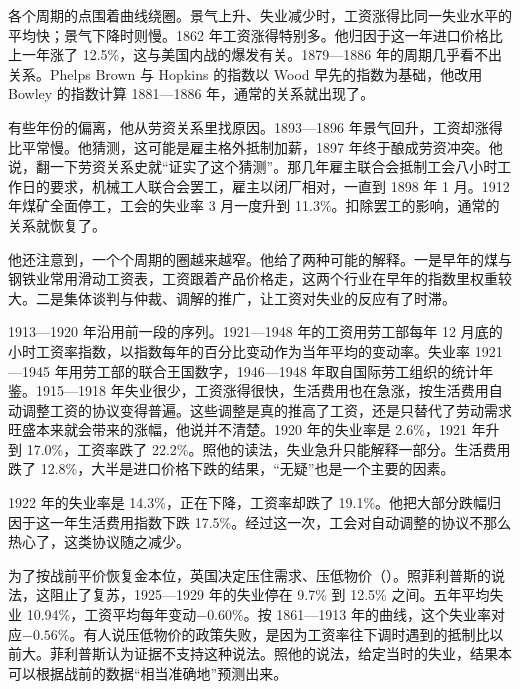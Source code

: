 各个周期的点围着曲线绕圈\cite{phillips1958}。景气上升、失业减少时，工资涨得比同一失业水平的平均快；景气下降时则慢\cite{phillips1958}。1862 年工资涨得特别多。他归因于这一年进口价格比上一年涨了 12.5\%，这与美国内战的爆发有关\cite{phillips1958}。1879—1886 年的周期几乎看不出关系\cite{phillips1958}。Phelps Brown 与 Hopkins 的指数以 Wood 早先的指数为基础，他改用 Bowley 的指数计算 1881—1886 年，通常的关系就出现了\cite{phillips1958}。

有些年份的偏离，他从劳资关系里找原因\cite{phillips1958}。1893—1896 年景气回升，工资却涨得比平常慢。他猜测，这可能是雇主格外抵制加薪，1897 年终于酿成劳资冲突\cite{phillips1958}。他说，翻一下劳资关系史就“证实了这个猜测”。那几年雇主联合会抵制工会八小时工作日的要求，机械工人联合会罢工，雇主以闭厂相对，一直到 1898 年 1 月\cite{phillips1958}。1912 年煤矿全面停工，工会的失业率 3 月一度升到 11.3\%。扣除罢工的影响，通常的关系就恢复了\cite{phillips1958}。

他还注意到，一个个周期的圈越来越窄\cite{phillips1958}。他给了两种可能的解释。一是早年的煤与钢铁业常用滑动工资表，工资跟着产品价格走，这两个行业在早年的指数里权重较大\cite{phillips1958}。二是集体谈判与仲裁、调解的推广，让工资对失业的反应有了时滞\cite{phillips1958}。

1913—1920 年沿用前一段的序列\cite{phillips1958}。1921—1948 年的工资用劳工部每年 12 月底的小时工资率指数，以指数每年的百分比变动作为当年平均的变动率\cite{phillips1958}。失业率 1921—1945 年用劳工部的联合王国数字，1946—1948 年取自国际劳工组织的统计年鉴\cite{phillips1958}。1915—1918 年失业很少，工资涨得很快，生活费用也在急涨，按生活费用自动调整工资的协议变得普遍\cite{phillips1958}。这些调整是真的推高了工资，还是只替代了劳动需求旺盛本来就会带来的涨幅，他说并不清楚\cite{phillips1958}。1920 年的失业率是 2.6\%，1921 年升到 17.0\%，工资率跌了 22.2\%\cite{phillips1958}。照他的读法，失业急升只能解释一部分。生活费用跌了 12.8\%，大半是进口价格下跌的结果，“无疑”也是一个主要的因素\cite{phillips1958}。

1922 年的失业率是 14.3\%，正在下降，工资率却跌了 19.1\%\cite{phillips1958}。他把大部分跌幅归因于这一年生活费用指数下跌 17.5\%\cite{phillips1958}。经过这一次，工会对自动调整的协议不那么热心了，这类协议随之减少\cite{phillips1958}。

为了按战前平价恢复金本位，英国决定压住需求、压低物价（）。照菲利普斯的说法，这阻止了复苏，1925—1929 年的失业停在 9.7\% 到 12.5\% 之间\cite{phillips1958}。五年平均失业 10.94\%，工资平均每年变动$-0.60\%$\cite{phillips1958}。按 1861—1913 年的曲线，这个失业率对应$-0.56\%$\cite{phillips1958}。有人说压低物价的政策失败，是因为工资率往下调时遇到的抵制比以前大。菲利普斯认为证据不支持这种说法\cite{phillips1958}。照他的说法，给定当时的失业，结果本可以根据战前的数据“相当准确地”预测出来\cite{phillips1958}。

